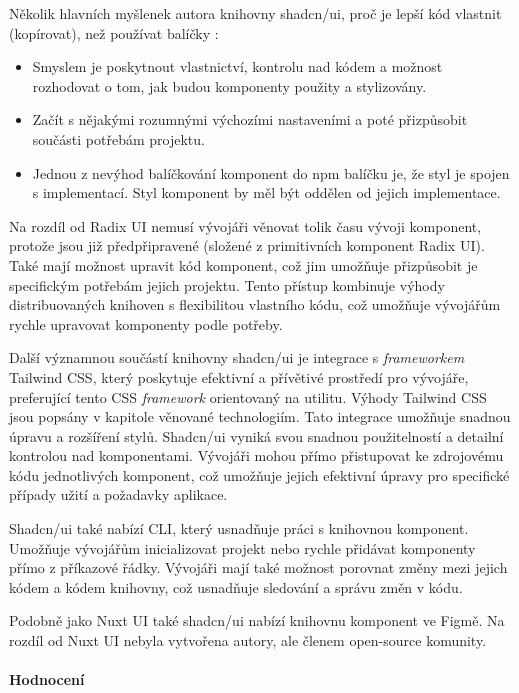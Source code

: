 Několik hlavních myšlenek autora knihovny shadcn/ui, proč je lepší kód vlastnit (kopírovat), než používat balíčky \cite{ShadcnUI}:

\begin{itemize}
    \item Smyslem je poskytnout vlastnictví, kontrolu nad kódem a možnost rozhodovat o tom, jak budou komponenty použity a stylizovány.
    \item Začít s nějakými rozumnými výchozími nastaveními a poté přizpůsobit součásti potřebám projektu.
    \item Jednou z nevýhod balíčkování komponent do npm balíčku je, že styl je spojen s implementací. Styl komponent by měl být oddělen od jejich implementace.
\end{itemize}

Na rozdíl od Radix UI nemusí vývojáři věnovat tolik času vývoji komponent, protože jsou již předpřipravené (složené z primitivních komponent Radix UI). Také mají možnost upravit kód komponent, což jim umožňuje přizpůsobit je specifickým potřebám jejich projektu. Tento přístup kombinuje výhody distribuovaných knihoven s flexibilitou vlastního kódu, což umožňuje vývojářům rychle upravovat komponenty podle potřeby.

Další významnou součástí knihovny shadcn/ui je integrace s \emph{frameworkem} Tailwind CSS, který poskytuje efektivní a přívětivé prostředí pro vývojáře, preferující tento CSS \emph{framework} orientovaný na utilitu. Výhody Tailwind CSS jsou popsány v kapitole věnované technologiím. Tato integrace umožňuje snadnou úpravu a rozšíření stylů. Shadcn/ui vyniká svou snadnou použitelností a detailní kontrolou nad komponentami. Vývojáři mohou přímo přistupovat ke zdrojovému kódu jednotlivých komponent, což umožňuje jejich efektivní úpravy pro specifické případy užití a požadavky aplikace.

Shadcn/ui také nabízí CLI, který usnadňuje práci s knihovnou komponent. Umožňuje vývojářům inicializovat projekt nebo rychle přidávat komponenty přímo z příkazové řádky. Vývojáři mají také možnost porovnat změny mezi jejich kódem a kódem knihovny, což usnadňuje sledování a správu změn v kódu.

Podobně jako Nuxt UI také shadcn/ui nabízí knihovnu komponent ve Figmě. Na rozdíl od Nuxt UI nebyla vytvořena autory, ale členem open-source komunity. \cite{ShadcnUIFigma}

\paragraph{Hodnocení}

